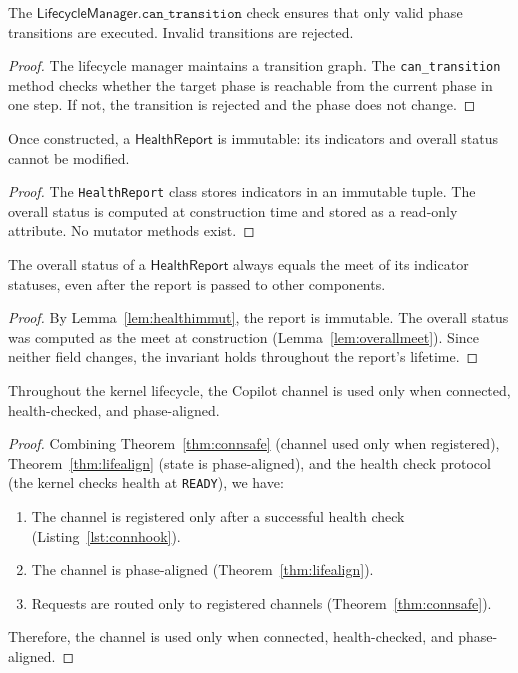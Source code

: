 \documentclass[11pt]{article}
\newcommand{\LifeMgr}{\mathsf{LifecycleManager}}
\newcommand{\HealthRep}{\mathsf{HealthReport}}
\begin{document}
\begin{lemma}\label{lem:phasetransval}
The $\LifeMgr.\texttt{can\_transition}$ check ensures that
only valid phase transitions are executed.  Invalid transitions
are rejected.
\end{lemma}
\begin{proof}
The lifecycle manager maintains a transition graph.  The
\texttt{can\_transition} method checks whether the target
phase is reachable from the current phase in one step.
If not, the transition is rejected and the phase does not
change.
\end{proof}

\begin{lemma}\label{lem:healthimmut}
Once constructed, a $\HealthRep$ is immutable: its indicators
and overall status cannot be modified.
\end{lemma}
\begin{proof}
The \texttt{HealthReport} class stores indicators in an
immutable tuple.  The overall status is computed at
construction time and stored as a read-only attribute.
No mutator methods exist.
\end{proof}

\begin{corollary}\label{cor:healthcons}
The overall status of a $\HealthRep$ always equals the meet
of its indicator statuses, even after the report is passed
to other components.
\end{corollary}
\begin{proof}
By Lemma~\ref{lem:healthimmut}, the report is immutable.
The overall status was computed as the meet at construction
(Lemma~\ref{lem:overallmeet}).  Since neither field changes,
the invariant holds throughout the report's lifetime.
\end{proof}

\begin{proposition}%
\label{prop:e2esafety}
Throughout the kernel lifecycle, the Copilot channel is used
only when connected, health-checked, and phase-aligned.
\end{proposition}
\begin{proof}
Combining Theorem~\ref{thm:connsafe} (channel used only when
registered), Theorem~\ref{thm:lifealign} (state is
phase-aligned), and the health check protocol (the kernel
checks health at \texttt{READY}), we have:
\begin{enumerate}
\item The channel is registered only after a successful
      health check (Listing~\ref{lst:connhook}).
\item The channel is phase-aligned (Theorem~\ref{thm:lifealign}).
\item Requests are routed only to registered channels
      (Theorem~\ref{thm:connsafe}).
\end{enumerate}
Therefore, the channel is used only when connected,
health-checked, and phase-aligned.
\end{proof}
\end{document}
